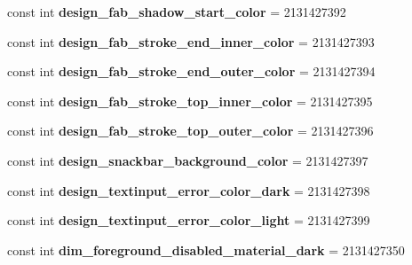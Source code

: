 \begin{DoxyCompactItemize}
\item 
\mbox{\label{classXaria_1_1Resource_1_1Color_a7bae3fe0e9defa7f84dc47019e60c28a}} 
const int {\bfseries design\+\_\+fab\+\_\+shadow\+\_\+start\+\_\+color} = 2131427392
\item 
\mbox{\label{classXaria_1_1Resource_1_1Color_a2bcdad0c59f20aa001648637a7c95bb9}} 
const int {\bfseries design\+\_\+fab\+\_\+stroke\+\_\+end\+\_\+inner\+\_\+color} = 2131427393
\item 
\mbox{\label{classXaria_1_1Resource_1_1Color_ae06aebcdfa4afcacc4d9a2f057bb5afb}} 
const int {\bfseries design\+\_\+fab\+\_\+stroke\+\_\+end\+\_\+outer\+\_\+color} = 2131427394
\item 
\mbox{\label{classXaria_1_1Resource_1_1Color_ac4df553f3faed34b079ff92a73466e27}} 
const int {\bfseries design\+\_\+fab\+\_\+stroke\+\_\+top\+\_\+inner\+\_\+color} = 2131427395
\item 
\mbox{\label{classXaria_1_1Resource_1_1Color_acd1439263b0e03df7d8f2775cabb77af}} 
const int {\bfseries design\+\_\+fab\+\_\+stroke\+\_\+top\+\_\+outer\+\_\+color} = 2131427396
\item 
\mbox{\label{classXaria_1_1Resource_1_1Color_a5bb0534a10e1e744d86362321001f402}} 
const int {\bfseries design\+\_\+snackbar\+\_\+background\+\_\+color} = 2131427397
\item 
\mbox{\label{classXaria_1_1Resource_1_1Color_afece6d4851bca7192e10595a507df2c9}} 
const int {\bfseries design\+\_\+textinput\+\_\+error\+\_\+color\+\_\+dark} = 2131427398
\item 
\mbox{\label{classXaria_1_1Resource_1_1Color_a1c192a03c05c2bdabd9c55ab0e973ec2}} 
const int {\bfseries design\+\_\+textinput\+\_\+error\+\_\+color\+\_\+light} = 2131427399
\item 
\mbox{\label{classXaria_1_1Resource_1_1Color_ab2b10a2c34cb52bea4d8411fa0101286}} 
const int {\bfseries dim\+\_\+foreground\+\_\+disabled\+\_\+material\+\_\+dark} = 2131427350

\end{DoxyCompactItemize}
